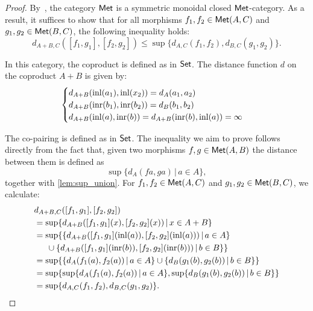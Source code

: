 \begin{proof}
  By~\cite[Example 3.8]{dahlqvist2023syntactic}, the category $\mathsf{Met}$ is a symmetric monoidal closed $\mathsf{Met}$-category. As a result, it suffices to show that for all morphisms \( f_1, f_2 \in \mathsf{Met}(A, C) \) and \( g_1, g_2 \in \mathsf{Met}(B, C) \), the following inequality holds:
\[
  d_{A + B, C}([f_1, g_1], [f_2, g_2]) \leq \sup \{d_{A,C}(f_1, f_2), d_{B,C}(g_1, g_2)\}.
\]

In this category, the coproduct is defined as in $\mathsf{Set}$. The distance function $d$ on the coproduct $A + B$ is given by:
   \[
    \begin{cases}
    d_{A + B}(\mathrm{inl}(a_1),\mathrm{inl}(x_2)) = d_A(a_1,a_2) \\
    d_{A + B}(\mathrm{inr}(b_1),\mathrm{inr}(b_2)) = d_B(b_1,b_2) \\
    d_{A + B}(\mathrm{inl}(a), \mathrm{inr}(b)) = 
    d_{A + B}(\mathrm{inr}(b), \mathrm{inl}(a))  = \infty
    \end{cases}
    \]

    The co-pairing is defined as in $\mathsf{Set}$. The inequality we aim to prove follows directly from the fact that, given two morphisms  $f,g\in \mathsf{Met}(A, B)$ the distance between them is defined as 
  \[ \sup \{ d_A (f a, g a) \,\vert \, a \in A \} ,\] 
    together with \autoref{lem:sup_union}. For  \( f_1, f_2 \in \mathsf{Met}(A, C) \) and \( g_1, g_2 \in \mathsf{Met}(B, C) \), we calculate:
    \begin{align*}
      & d_{A + B, C}([f_1, g_1], [f_2, g_2]) \\
      &  =  \sup \{ d_{A+ B} ([f_1, g_1] (x), [f_2, g_2] (x)) \,\vert \, x \in A + B \} \\
      & =  \sup \{ \{ d_{A+ B} ([f_1, g_1] (\mathrm{inl}(a)), [f_2, g_2] (\mathrm{inl}(a))) \,\vert \, a \in A \}    \\
      & \hspace{15pt} \cup \{d_{A+ B} ([f_1, g_1] (\mathrm{inr}(b)), [f_2, g_2] (\mathrm{inr}(b))) \,\vert \, b \in B\}\} \\
      & = \sup \{ \{ d_{A}(f_1 (a), f_2 (a)) \,\vert \, a \in A \} \cup  \{d_{B}(g_1 (b), g_2 (b)) \,\vert \, b \in B \}\} \\
      & = \sup   \{ \sup \{ d_{A}(f_1 (a), f_2 (a)) \,\vert \, a \in A \}, \sup\{d_{B}(g_1 (b), g_2 (b)) \,\vert \, b \in B \}\} \\
      &=  \sup \{d_{A,C}(f_1, f_2), d_{B,C}(g_1, g_2)\}. 
    \end{align*}
\end{proof}


